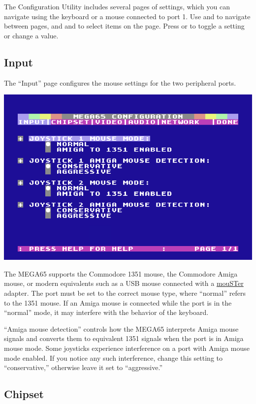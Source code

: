 The Configuration Utility includes several pages of settings, which you can navigate using the keyboard or a mouse connected to port 1. Use \megakey{$\leftarrow$} and \megakey{$\rightarrow$} to navigate between pages, and \megakey{$\uparrow$} and \megakey{$\downarrow$} to select items on the page. Press  or  to toggle a setting or change a value.

\subsection{Input}

The ``Input'' page configures the mouse settings for the two peripheral ports.

\begin{center}
  \includegraphics[width=0.7\linewidth]{images/ss-m65config-1.png}
\end{center}

The MEGA65 supports the Commodore 1351 mouse, the Commodore Amiga mouse, or modern equivalents such as a USB mouse connected with a \href{https://retrohax.net/shop/amiga/mouster/}{mouSTer} adapter. The port must be set to the correct mouse type, where ``normal'' refers to the 1351 mouse. If an Amiga mouse is connected while the port is in the ``normal'' mode, it may interfere with the behavior of the keyboard.

``Amiga mouse detection'' controls how the MEGA65 interprets Amiga mouse signals and converts them to equivalent 1351 signals when the port is in Amiga mouse mode. Some joysticks experience interference on a port with Amiga mouse mode enabled. If you notice any such interference, change this setting to ``conservative,'' otherwise leave it set to ``aggressive.''

\subsection{Chipset}

